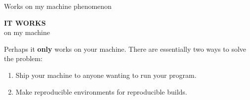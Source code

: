 \documentclass[
	9pt,
	hyperref = {unicode,pdfpagelabels=false},
	aspectratio = 43
	]{beamer}
\begin{document}
\begin{frame}{Works on my machine phenomenon}
	\begin{center}
		\huge
		\textbf{IT WORKS}\\
		on my machine
	\end{center}

	\vspace{2em}

	Perhaps it \textbf{only} works on your machine. There are essentially two ways to solve the problem:
	\begin{enumerate}
	 	\item Ship your machine to anyone wanting to run your program.
	 	\item Make reproducible environments for reproducible builds.
	\end{enumerate} 
\end{frame}
\end{document}
